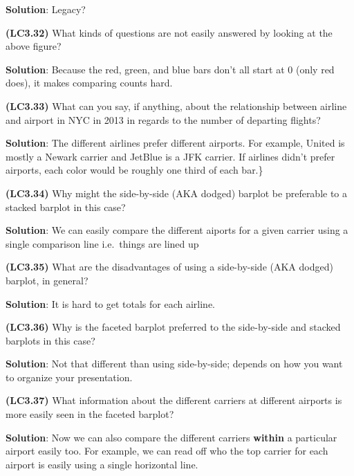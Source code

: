 \documentclass[12pt,]{krantz}
\begin{document}
\textbf{Solution}: Legacy?

\textbf{(LC3.32)} What kinds of questions are not easily answered by
looking at the above figure?

\textbf{Solution}: Because the red, green, and blue bars don't all start
at 0 (only red does), it makes comparing counts hard.

\textbf{(LC3.33)} What can you say, if anything, about the relationship
between airline and airport in NYC in 2013 in regards to the number of
departing flights?

\textbf{Solution}: The different airlines prefer different airports. For
example, United is mostly a Newark carrier and JetBlue is a JFK carrier.
If airlines didn't prefer airports, each color would be roughly one
third of each bar.\}

\textbf{(LC3.34)} Why might the side-by-side (AKA dodged) barplot be
preferable to a stacked barplot in this case?

\textbf{Solution}: We can easily compare the different aiports for a
given carrier using a single comparison line i.e.~things are lined up

\textbf{(LC3.35)} What are the disadvantages of using a side-by-side
(AKA dodged) barplot, in general?

\textbf{Solution}: It is hard to get totals for each airline.

\textbf{(LC3.36)} Why is the faceted barplot preferred to the
side-by-side and stacked barplots in this case?

\textbf{Solution}: Not that different than using side-by-side; depends
on how you want to organize your presentation.

\textbf{(LC3.37)} What information about the different carriers at
different airports is more easily seen in the faceted barplot?

\textbf{Solution}: Now we can also compare the different carriers
\textbf{within} a particular airport easily too. For example, we can
read off who the top carrier for each airport is easily using a single
horizontal line.



\backmatter
\printindex
\end{document}
